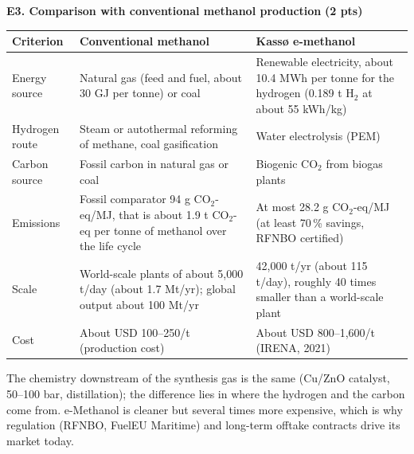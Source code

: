 \documentclass[11pt,a4paper]{article}
\newcommand{\pts}[1]{\hfill{\normalsize\textbf{(#1)}}}
\begin{document}
\textbf{E3. Comparison with conventional methanol production} \pts{2 pts}

{\small
\renewcommand{\arraystretch}{1.35}
\begin{tabularx}{\linewidth}{@{}>{\raggedright\arraybackslash}p{2.6cm}YY@{}}
\toprule
\textbf{Criterion} & \textbf{Conventional methanol} & \textbf{Kassø e-methanol}\\
\midrule
Energy source & Natural gas (feed and fuel, about 30 GJ per tonne) or coal & Renewable electricity, about 10.4 MWh per tonne for the hydrogen (0.189 t H$_2$ at about 55 kWh/kg)\\
Hydrogen route & Steam or autothermal reforming of methane, coal gasification & Water electrolysis (PEM)\\
Carbon source & Fossil carbon in natural gas or coal & Biogenic CO$_2$ from biogas plants\\
Emissions & Fossil comparator 94 g CO$_2$-eq/MJ, that is about 1.9 t CO$_2$-eq per tonne of methanol over the life cycle & At most 28.2 g CO$_2$-eq/MJ (at least 70\,\% savings, RFNBO certified)\\
Scale & World-scale plants of about 5,000 t/day (about 1.7 Mt/yr); global output about 100 Mt/yr & 42,000 t/yr (about 115 t/day), roughly 40 times smaller than a world-scale plant\\
Cost & About USD 100--250/t (production cost) & About USD 800--1,600/t (IRENA, 2021)\\
\bottomrule
\end{tabularx}}

\medskip
The chemistry downstream of the synthesis gas is the same (Cu/ZnO catalyst, 50--100 bar, distillation); the difference
lies in where the hydrogen and the carbon come from. e-Methanol is cleaner but several times more expensive, which
is why regulation (RFNBO, FuelEU Maritime) and long-term offtake contracts drive its market today.
\end{document}
